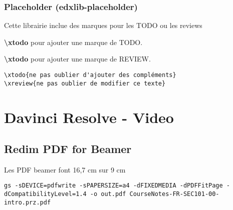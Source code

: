 \documentclass[a4paper,10pt,twocolumn]{article}
\begin{document}

\subsubsection{Placeholder (edxlib-placeholder)}	
Cette librairie inclue des marques pour les TODO ou les reviews

\textbf{\textbackslash xtodo} pour ajouter une marque de TODO.


\textbf{\textbackslash xtodo} pour ajouter une marque de REVIEW.
\begin{lstlisting}[style=LATEX]
\xtodo{ne pas oublier d'ajouter des compléments}
\xreview{ne pas oublier de modifier ce texte}
\end{lstlisting}

\section{Davinci Resolve - Video}
\subsection{Redim PDF for Beamer}
Les PDF beamer font 16,7 cm sur 9 cm

\begin{verbatim}	
gs -sDEVICE=pdfwrite -sPAPERSIZE=a4 -dFIXEDMEDIA -dPDFFitPage -dCompatibilityLevel=1.4 -o out.pdf CourseNotes-FR-SEC101-00-intro.prz.pdf
\end{verbatim}
	
\end{document}
